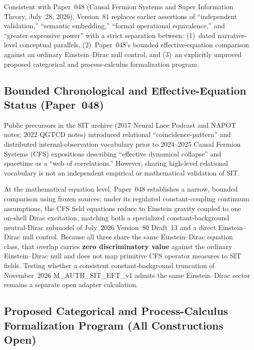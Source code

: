 \documentclass[american,11pt,letterpaper]{article}
\def\texttt#1{#1}%
\def\emph#1{#1}%
\begin{document}
Consistent with Paper~048 (\emph{Causal Fermion Systems and Super Information Theory}, July~28, 2026), Version~81 replaces earlier assertions of ``independent validation,'' ``semantic embedding,'' ``formal operational equivalence,'' and ``greater expressive power'' with a strict separation between: (1)~dated narrative-level conceptual parallels, (2)~Paper~048's bounded effective-equation comparison against an ordinary Einstein--Dirac null control, and (3)~an explicitly \emph{unproved} proposed categorical and process-calculus formalization program.

\subsection{Bounded Chronological and Effective-Equation Status (Paper~048)}

Public precursors in the SIT archive (2017 Neural Lace Podcast and NAPOT notes; 2022 QGTCD notes) introduced relational ``coincidence-pattern'' and distributed internal-observation vocabulary prior to 2024--2025 Causal Fermion Systems (CFS) expositions describing ``effective dynamical collapse'' and spacetime as a ``web of correlations.'' However, sharing high-level relational vocabulary is \emph{not} an independent empirical or mathematical validation of SIT.

At the mathematical equation level, Paper~048 establishes a narrow, bounded comparison using frozen sources: under its regulated constant-coupling continuum assumptions, the CFS field equations reduce to Einstein gravity coupled to one on-shell Dirac excitation, matching both a specialized constant-background neutral-Dirac submodel of July~2026 Version~80 Draft~13 and a direct Einstein--Dirac null control. Because all three share the same Einstein--Dirac equation class, that overlap carries \textbf{zero discriminatory value} against the ordinary Einstein--Dirac null and does not map primitive CFS operator measures to SIT fields. Testing whether a consistent constant-background truncation of November~2026 \texttt{M\_AUTH\_SIT\_EFT\_v1} admits the same Einstein--Dirac sector remains a separate open adapter calculation.

\subsection{Proposed Categorical and Process-Calculus Formalization Program (All Constructions Open)}
\end{document}
